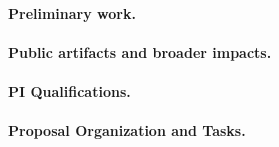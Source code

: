 \paragraph{Preliminary work.}

\paragraph{Public artifacts and broader impacts.} 

\paragraph{PI Qualifications.}

\paragraph{Proposal Organization and Tasks.}


